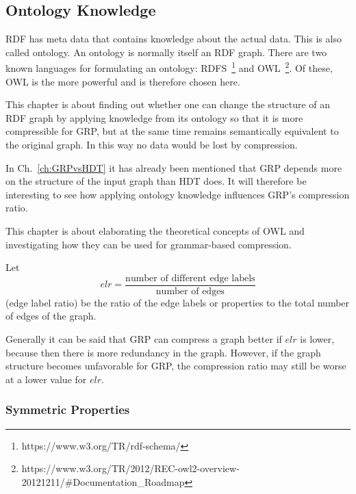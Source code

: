 \subsection{Ontology Knowledge}\label{sec:approachOntKnowledge}

RDF has meta data that contains knowledge about the actual data. This is also called ontology. An ontology is normally itself an RDF graph. There are two known languages for formulating an ontology: RDFS~\footnote{\label{foot:3}https://www.w3.org/TR/rdf-schema/} and OWL~\footnote{\label{foot:4}https://www.w3.org/TR/2012/REC-owl2-overview-20121211/\#Documentation\_Roadmap}. Of these, OWL is the more powerful and is therefore chosen here.

This chapter is about finding out whether one can change the structure of an RDF graph by applying knowledge from its ontology so that it is more compressible for GRP, but at the same time remains semantically equivalent to the original graph. In this way no data would be lost by compression.

In Ch.~\ref{ch:GRPvsHDT}  it has already been mentioned that GRP depends more on the structure of the input graph than HDT does. It will therefore be interesting to see how applying ontology knowledge influences GRP's compression ratio.

This chapter is about elaborating the theoretical concepts of OWL and investigating how they can be used for grammar-based compression.

Let \[ elr = \dfrac{\text{number of different edge labels}}{\text{number of edges}} \] (edge label ratio) be the ratio of the edge labels or properties to the total number of edges of the graph. 

Generally it can be said that GRP can compress a graph better if $elr$ is lower, because then there is more redundancy in the graph. However, if the graph structure becomes unfavorable for GRP, the compression ratio may still be worse at a lower value for $elr$.


\subsubsection{Symmetric Properties}

